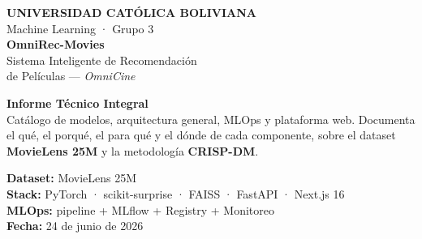 \documentclass[11pt,a4paper]{article}
\begin{document}
\sffamily

\begin{titlepage}
\thispagestyle{empty}
\vspace*{0.6cm}
\begin{flushleft}
{\color{white}\fontsize{13}{16}\selectfont \textbf{UNIVERSIDAD CATÓLICA BOLIVIANA} \\[2pt]
\normalsize Machine Learning · Grupo 3}\\[1.6cm]
{\color{white}\fontsize{30}{34}\selectfont\bfseries OmniRec-Movies}\\[6pt]
{\color{omnisoft}\Large Sistema Inteligente de Recomendación\\[2pt] de Películas — \textit{OmniCine}}\\[3.0cm]
\end{flushleft}

\vfill
\begin{tcolorbox}[colback=omnilight,colframe=omniprimary,boxrule=0.8pt,arc=3pt]
\begin{minipage}{0.62\textwidth}
\textbf{\color{omniprimary}Informe Técnico Integral}\\[2pt]
\small Catálogo de modelos, arquitectura general, MLOps y plataforma web. Documenta el qué, el porqué, el para qué y el dónde de cada componente, sobre el dataset \textbf{MovieLens 25M} y la metodología \textbf{CRISP-DM}.
\end{minipage}\hfill
\begin{minipage}{0.32\textwidth}
\footnotesize
\textbf{Dataset:} MovieLens 25M\\
\textbf{Stack:} PyTorch · scikit-surprise · FAISS · FastAPI · Next.js 16\\
\textbf{MLOps:} pipeline + MLflow + Registry + Monitoreo\\
\textbf{Fecha:} 24 de junio de 2026
\end{minipage}
\end{tcolorbox}
\end{titlepage}

\end{document}
